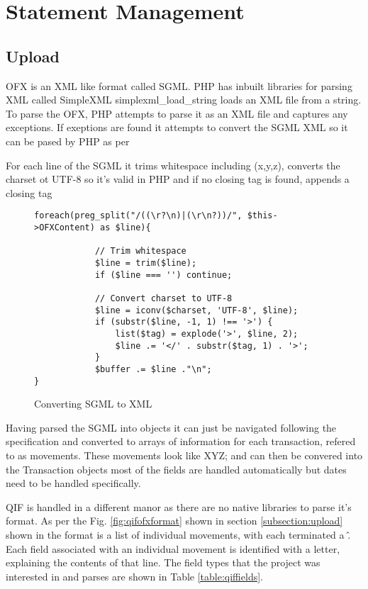\section[Statement Management]{Statement Management}

\subsection{Upload}
OFX is an XML like format called SGML. PHP has inbuilt libraries for parsing XML called SimpleXML simplexml\_load\_string loads an XML file from a string. To parse the OFX, PHP attempts to parse it as an XML file and captures any exceptions. If exeptions are found it attempts to convert the SGML XML so it can be pased by PHP as per 



For each line of the SGML it trims whitespace including (x,y,z), converts the charset ot UTF-8 so it's valid in PHP and if no closing tag is found, appends a closing tag

\begin{figure}
\lstset{style=phpcolor}
\begin{lstlisting}
foreach(preg_split("/((\r?\n)|(\r\n?))/", $this->OFXContent) as $line){
        		
        	// Trim whitespace
        	$line = trim($line);
        	if ($line === '') continue;
        
        	// Convert charset to UTF-8
        	$line = iconv($charset, 'UTF-8', $line);
        	if (substr($line, -1, 1) !== '>') {
        		list($tag) = explode('>', $line, 2);
        		$line .= '</' . substr($tag, 1) . '>';
        	}
        	$buffer .= $line ."\n";
}
\end{lstlisting}
\caption{Converting SGML to XML}
\end{figure}

Having parsed the SGML into objects it can just be navigated following the specification and converted to arrays of information for each transaction, refered to as movements. These movements look like XYZ; and can then be convered into the Transaction objects most of the fields are handled automatically but dates need to be handled specifically.

QIF is handled in a different manor as there are no native libraries to parse it's format. As per the Fig. \ref{fig:qifofxformat} shown in section \ref{subsection:upload} shown in  the format is a list of individual movements, with each terminated a \^. Each field associated with an individual movement is identified with a letter, explaining the contents of that line.
% 
The field types that the project was interested in and parses are shown in Table \ref{table:qiffields}.

